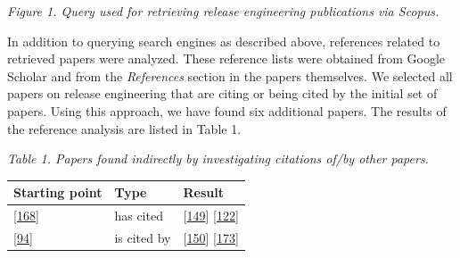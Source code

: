 \documentclass[]{book}
\begin{document}
\emph{Figure 1. Query used for retrieving release engineering
publications via Scopus.}

In addition to querying search engines as described above, references
related to retrieved papers were analyzed. These reference lists were
obtained from Google Scholar and from the \emph{References} section in
the papers themselves. We selected all papers on release engineering
that are citing or being cited by the initial set of papers. Using this
approach, we have found six additional papers. The results of the
reference analysis are listed in Table 1.

\emph{Table 1. Papers found indirectly by investigating citations of/by
other papers.}

\begin{longtable}[]{@{}lll@{}}
\toprule
\begin{minipage}[b]{0.23\columnwidth}\raggedright\strut
Starting point\strut
\end{minipage} & \begin{minipage}[b]{0.18\columnwidth}\raggedright\strut
Type\strut
\end{minipage} & \begin{minipage}[b]{0.25\columnwidth}\raggedright\strut
Result\strut
\end{minipage}\tabularnewline
\midrule
\endhead
\begin{minipage}[t]{0.23\columnwidth}\raggedright\strut
{[}\protect\hyperlink{ref-souza2015a}{168}{]}\strut
\end{minipage} & \begin{minipage}[t]{0.18\columnwidth}\raggedright\strut
has cited\strut
\end{minipage} & \begin{minipage}[t]{0.25\columnwidth}\raggedright\strut
{[}\protect\hyperlink{ref-plewnia2014a}{149}{]}
{[}\protect\hyperlink{ref-mantyla2015a}{122}{]}\strut
\end{minipage}\tabularnewline
\begin{minipage}[t]{0.23\columnwidth}\raggedright\strut
{[}\protect\hyperlink{ref-khomh2015a}{94}{]}\strut
\end{minipage} & \begin{minipage}[t]{0.18\columnwidth}\raggedright\strut
is cited by\strut
\end{minipage} & \begin{minipage}[t]{0.25\columnwidth}\raggedright\strut
{[}\protect\hyperlink{ref-poo-caamano2016a}{150}{]}
{[}\protect\hyperlink{ref-teixeira2017a}{173}{]}\strut
\end{minipage}\tabularnewline

\end{longtable}
\end{document}
